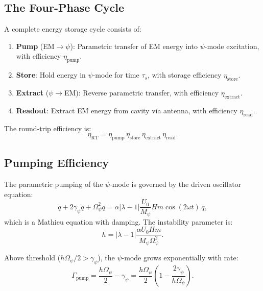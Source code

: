 \documentclass[aps,prd,twocolumn,showpacs,preprintnumbers,superscriptaddress,nofootinbib]{revtex4-2}
\newcommand{\Mpsi}{M_\psi}
\newcommand{\Opsi}{\Omega_\psi}
\begin{document}
\subsection{The Four-Phase Cycle}\label{sec:four-phase}

A complete energy storage cycle consists of:
\begin{enumerate}
\item \textbf{Pump} (EM$\to\psi$): Parametric transfer of EM energy
into $\psi$-mode excitation, with efficiency $\eta_{\mathrm{pump}}$.
\item \textbf{Store}: Hold energy in $\psi$-mode for time $\tau_s$,
with storage efficiency $\eta_{\mathrm{store}}$.
\item \textbf{Extract} ($\psi\to$EM): Reverse parametric transfer, with
efficiency $\eta_{\mathrm{extract}}$.
\item \textbf{Readout}: Extract EM energy from cavity via antenna, with
efficiency $\eta_{\mathrm{read}}$.
\end{enumerate}

The round-trip efficiency is:
\begin{equation}\label{eq:eta-RT}
\eta_{\mathrm{RT}} = \eta_{\mathrm{pump}}\,\eta_{\mathrm{store}}\,
  \eta_{\mathrm{extract}}\,\eta_{\mathrm{read}}.
\end{equation}

\subsection{Pumping Efficiency}\label{sec:pump-eff}

The parametric pumping of the $\psi$-mode is governed by the driven
oscillator equation:
\begin{equation}
\ddot{q} + 2\gamma_\psi\dot{q} + \Opsi^2 q
  = \alpha|\lambda-1|\frac{U_0}{M_\psi}Hm\cos(2\omega t)\,q,
\end{equation}
which is a Mathieu equation with damping.  The instability parameter is:
\begin{equation}\label{eq:h-param}
h = |\lambda-1|\frac{\alpha U_0 Hm}{\Mpsi\Opsi^2}.
\end{equation}

Above threshold ($h\Opsi/2 > \gamma_\psi$), the $\psi$-mode grows
exponentially with rate:
\begin{equation}\label{eq:Gamma-pump}
\Gamma_{\mathrm{pump}} = \frac{h\Opsi}{2} - \gamma_\psi
  = \frac{h\Opsi}{2}\left(1 - \frac{2\gamma_\psi}{h\Opsi}\right).
\end{equation}
\end{document}
